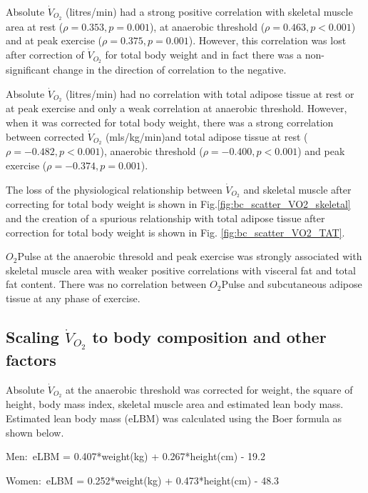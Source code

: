 Absolute $\dot{V}_{O_2}$ (litres/min) had a strong positive correlation with skeletal muscle area at rest ($\rho = 0.353, p = 0.001$), at anaerobic threshold ($\rho = 0.463, p<0.001$) and at peak exercise ($\rho = 0.375, p = 0.001$). However, this correlation was lost after correction of $\dot{V}_{O_2}$ for total body weight and in fact there was a non-significant change in the direction of correlation to the negative.

Absolute $\dot{V}_{O_2}$ (litres/min) had no correlation with total adipose tissue at rest or at peak exercise and only a weak correlation at anaerobic threshold. However, when it was corrected for total body weight, there was a strong correlation between corrected $\dot{V}_{O_2}$ (mls/kg/min)and total adipose tissue at rest ($\rho = -0.482, p<0.001$), anaerobic threshold ($\rho = -0.400, p<0.001$) and peak exercise ($\rho = -0.374, p = 0.001$).

The loss of the physiological relationship between $\dot{V}_{O_2}$ and skeletal muscle after correcting for total body weight is shown in Fig.\ref{fig:bc_scatter_VO2_skeletal} and the creation of a spurious relationship with total adipose tissue after correction for total body weight is shown in Fig. \ref{fig:bc_scatter_VO2_TAT}.

$O_2$Pulse at the anaerobic thresold and peak exercise was strongly associated with skeletal muscle area with weaker positive correlations with visceral fat and total fat content. There was no correlation between $O_2$Pulse and subcutaneous adipose tissue at any phase of exercise.


\subsection{Scaling $\dot{V}_{O_2}$ to body composition and other factors}


Absolute $\dot{V}_{O_2}$ at the anaerobic threshold was corrected for weight, the square of height, body mass index, skeletal muscle area and estimated lean body mass. Estimated lean body mass (eLBM) was calculated using the Boer formula \parencite{boer_estimated_1984} as shown below.

Men:\ eLBM = 0.407*weight(kg) + 0.267*height(cm) - 19.2

Women:\ eLBM = 0.252*weight(kg) + 0.473*height(cm) - 48.3

